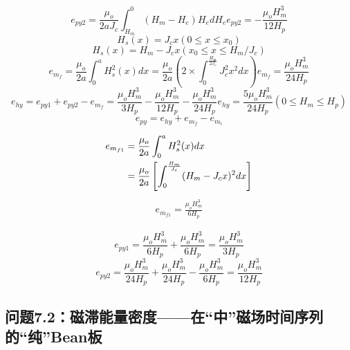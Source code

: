 \begin{equation}%
e_{py2}=\frac{\mu_o}{2aJ_c}\int_{H_m}^{0}(H_m-H_e)H_edH_e
e_{py2}=-\frac{\mu_oH_{m}^{3}}{12H_p}
\end{equation}
\begin{equation}%
H_s(x)=J_cx        (0\leq x\leq x_0)
\end{equation}
\begin{equation}%
H_s(x)=H_m-J_cx    (x_0\leq x\leq H_m/J_c)
\end{equation}
\begin{equation}%
e_{m_f}=\frac{\mu_o}{2a}\int_{0}^{a}H_{s}^{2}(x)dx=\frac{\mu_o}{2a}\left(2\times\int_{0}^{\frac{H_m}{2J_c}}J_{c}^{2}x^2dx\right)
e_{m_f}=\frac{\mu_oH_{m}^{3}}{24H_p}
\end{equation}
\begin{equation}%
e_{hy}=e_{py1}+e_{py2}-e_{m_f} 
=\frac{\mu_oH_{m}^{3}}{3H_p}-\frac{\mu_oH_{m}^{3}}{12H_p}-\frac{\mu_oH_{m}^{3}}{24H_p}
e_{hy}=\frac{5\mu_oH_{m}^{3}}{24H_p}       (0\leq H_m\leq H_p)
\end{equation}
\begin{equation}%
e_{py}=e_{hy}+e_{m_f}-e_{m_i}
\end{equation}


\begin{align*}%
e_{m_{f1}}&=\frac{\mu_o}{2a}\int_{0}^{a}H_{s}^{2}(x)dx \\\notag
&=\frac{\mu_o}{2a}\left[\int_{0}^{\frac{H_m}{J_c}}(H_m-J_cx)^2dx\right]
\end{align*}
\begin{align*}
e_{m_{f1}}=\frac{\mu_oH_{m}^{3}}{6H_p}
\end{align*}



\begin{equation}%
e_{py1}=\frac{\mu_oH_{m}^{3}}{6H_p}+\frac{\mu_oH_{m}^{3}}{6H_p}=\frac{\mu_oH_{m}^{3}}{3H_p}
\end{equation}
\begin{equation}%
e_{py2}=\frac{\mu_oH_{m}^{3}}{24H_p}+\frac{\mu_oH_{m}^{3}}{24H_p}-\frac{\mu_oH_{m}^{3}}{6H_p}=\frac{\mu_oH_{m}^{3}}{12H_p}
\end{equation}


\subsection{问题7.2：磁滞能量密度——在“中”磁场时间序列的“纯”Bean板}


